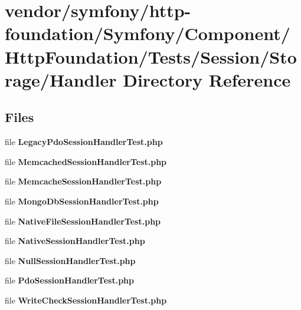 \section{vendor/symfony/http-\/foundation/\+Symfony/\+Component/\+Http\+Foundation/\+Tests/\+Session/\+Storage/\+Handler Directory Reference}
\label{dir_357d4669af87aa0267ee7aa9c37f370e}
\subsection*{Files}
\begin{DoxyCompactItemize}
\item 
file {\bf Legacy\+Pdo\+Session\+Handler\+Test.\+php}
\item 
file {\bf Memcached\+Session\+Handler\+Test.\+php}
\item 
file {\bf Memcache\+Session\+Handler\+Test.\+php}
\item 
file {\bf Mongo\+Db\+Session\+Handler\+Test.\+php}
\item 
file {\bf Native\+File\+Session\+Handler\+Test.\+php}
\item 
file {\bf Native\+Session\+Handler\+Test.\+php}
\item 
file {\bf Null\+Session\+Handler\+Test.\+php}
\item 
file {\bf Pdo\+Session\+Handler\+Test.\+php}
\item 
file {\bf Write\+Check\+Session\+Handler\+Test.\+php}
\end{DoxyCompactItemize}

